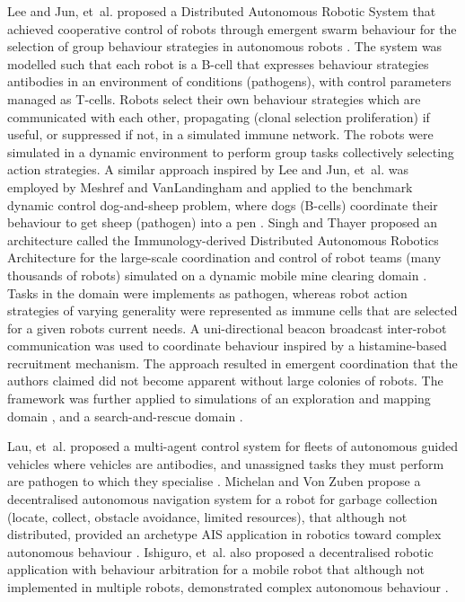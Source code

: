 Lee and Jun, et~al. proposed a Distributed Autonomous Robotic System that achieved cooperative control of robots through emergent swarm behaviour  for the selection of group behaviour strategies in autonomous robots \cite{Lee1999, Jun1999}. The system was modelled such that each robot is a B-cell that expresses  behaviour strategies antibodies in an environment of conditions (pathogens), with control parameters managed as T-cells. Robots select their own behaviour strategies which are communicated with each other, propagating (clonal selection proliferation) if useful, or suppressed if not, in a simulated immune network. The robots were simulated in a dynamic environment to perform group tasks collectively selecting action strategies. A similar approach inspired by Lee and Jun, et~al. was employed by Meshref and VanLandingham and applied to the benchmark dynamic control dog-and-sheep problem, where dogs (B-cells) coordinate their behaviour to get sheep (pathogen) into a pen \cite{Meshref2000}.
Singh and Thayer proposed an architecture called the Immunology-derived Distributed Autonomous Robotics Architecture for the large-scale coordination and control of robot teams (many thousands of robots) simulated on a dynamic mobile mine clearing domain \cite{Singh2001}. Tasks in the domain were implements as pathogen, whereas robot action strategies of varying generality were represented as immune cells that are selected for a given robots current needs. A uni-directional beacon broadcast inter-robot communication was used to coordinate behaviour inspired by a histamine-based recruitment mechanism. The approach resulted in emergent coordination that the authors claimed did not become apparent without large colonies of robots. The framework was further applied to simulations of an exploration and mapping domain \cite{Thayer2002, Singh2002b}, and a search-and-rescue domain \cite{Singh2002a}.

Lau, et~al. proposed a multi-agent control system for fleets of autonomous guided vehicles where vehicles are antibodies, and unassigned tasks they must perform are pathogen to which they specialise \cite{Lau2004, Lau2005, Lau2006}.
Michelan and Von Zuben propose a decentralised autonomous navigation system for a robot for garbage collection (locate, collect, obstacle avoidance, limited resources), that although not distributed, provided an archetype AIS application in robotics toward complex autonomous behaviour \cite{Michelan2002}. Ishiguro, et~al. also proposed a decentralised robotic application with behaviour arbitration for a mobile robot that although not implemented in multiple robots, demonstrated complex autonomous behaviour \cite{Ishiguro1995, Ishiguro1997}.

